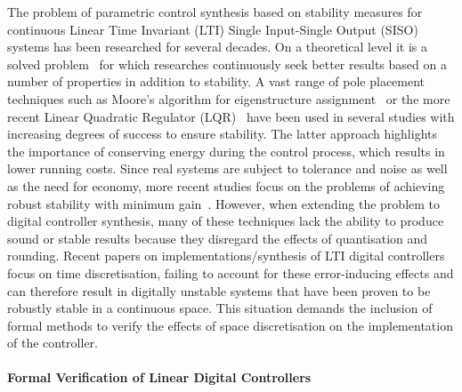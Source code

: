 \documentclass{sig-alternate-05-2015}
\begin{document}
The problem of parametric control synthesis based on stability measures for
continuous Linear Time Invariant (LTI) Single Input-Single Output (SISO)
systems has been researched for several decades.  On a theoretical level it
is a solved problem~\cite{wonham1967pole} for which researches continuously
seek better results based on a number of properties in addition to
stability.  A vast range of pole placement techniques such as Moore's
algorithm for eigenstructure assignment~\cite{klein1977eigenvalue} or the
more recent Linear Quadratic Regulator (LQR)~\cite{bemporad2002explicit}
have been used in several studies with increasing degrees of success to
ensure stability.  The latter approach highlights the importance of
conserving energy during the control process, which results in lower running
costs.  Since real systems are subject to tolerance and noise as well as the
need for economy, more recent studies focus on the problems of achieving
robust stability with minimum gain~\cite{schmid2014unified,
konigorski2012pole}.  However, when extending the problem to digital
controller synthesis, many of these techniques lack the ability to produce
sound or stable results because they disregard the effects of quantisation
and rounding.  Recent papers on implementations/synthesis of LTI digital
controllers~\cite{das2013lqr,ghosh2013fpga} focus on time discretisation,
failing to account for these error-inducing effects and can therefore result
in digitally unstable systems that have been proven to be robustly stable in
a continuous space.  This situation demands the inclusion of formal methods
to verify the effects of space discretisation on the implementation of the
controller.

\paragraph{Formal Verification of Linear Digital Controllers} 
\end{document}
